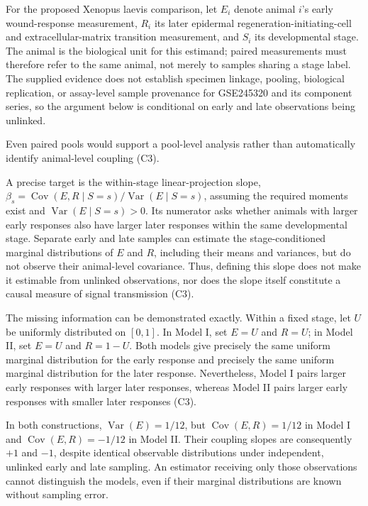 \documentclass[11pt]{article}
\begin{document}
For the proposed Xenopus laevis comparison, let $E_i$ denote animal $i$\textquoteright{}s early wound-response measurement, $R_i$ its later epidermal regeneration-initiating-cell and extracellular-matrix transition measurement, and $S_i$ its developmental stage. The animal is the biological unit for this estimand; paired measurements must therefore refer to the same animal, not merely to samples sharing a stage label. The supplied evidence does not establish specimen linkage, pooling, biological replication, or assay-level sample provenance for GSE245320 and its component series, so the argument below is conditional on early and late observations being unlinked.

Even paired pools would support a pool-level analysis rather than automatically identify animal-level coupling (C3).

A precise target is the within-stage linear-projection slope, $\beta_s=\operatorname{Cov}(E,R\mid S=s)/\operatorname{Var}(E\mid S=s)$, assuming the required moments exist and $\operatorname{Var}(E\mid S=s)>0$. Its numerator asks whether animals with larger early responses also have larger later responses within the same developmental stage. Separate early and late samples can estimate the stage-conditioned marginal distributions of $E$ and $R$, including their means and variances, but do not observe their animal-level covariance. Thus, defining this slope does not make it estimable from unlinked observations, nor does the slope itself constitute a causal measure of signal transmission (C3).

The missing information can be demonstrated exactly. Within a fixed stage, let $U$ be uniformly distributed on $[0,1]$. In Model I, set $E=U$ and $R=U$; in Model II, set $E=U$ and $R=1-U$. Both models give precisely the same uniform marginal distribution for the early response and precisely the same uniform marginal distribution for the later response. Nevertheless, Model I pairs larger early responses with larger later responses, whereas Model II pairs larger early responses with smaller later responses (C3).

In both constructions, $\operatorname{Var}(E)=1/12$, but $\operatorname{Cov}(E,R)=1/12$ in Model I and $\operatorname{Cov}(E,R)=-1/12$ in Model II. Their coupling slopes are consequently $+1$ and $-1$, despite identical observable distributions under independent, unlinked early and late sampling. An estimator receiving only those observations cannot distinguish the models, even if their marginal distributions are known without sampling error.
\end{document}
